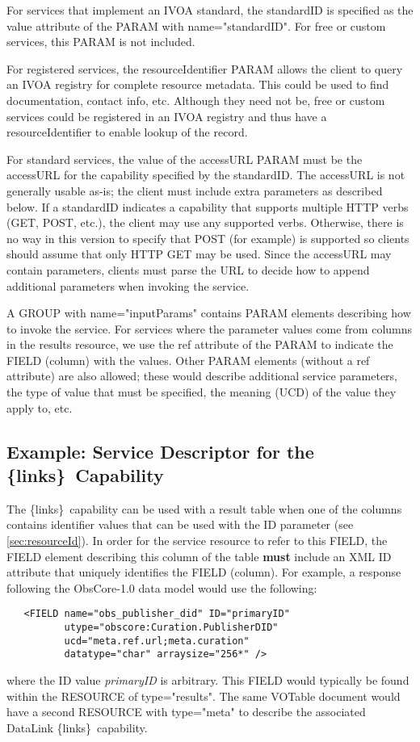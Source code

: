 \documentclass[11pt,a4paper]{ivoa}
\newcommand{\blinks}{\{links\}}
\newcommand{\attval}[2]{#1={\allowbreak}{"}#2{"}}
\begin{document}
For services that implement an IVOA standard, the standardID is specified
as the value attribute of the PARAM with \attval{name}{standardID}.
For free or custom services, this PARAM is not included.

For registered services, the resourceIdentifier PARAM allows the client
to query an IVOA registry for complete resource metadata. This could be
used to find documentation, contact info, etc. Although they need not be,
free or custom services could be registered in an IVOA registry and thus
have a resourceIdentifier to enable lookup of the record.

For standard services, the value of the accessURL PARAM must be the
accessURL for the capability specified by the standardID. The accessURL
is not generally usable as-is; the client must include extra parameters
as described below. If a standardID indicates a capability that supports
multiple HTTP verbs (GET, POST, etc.), the client may use any supported
verbs. Otherwise, there is no way in this version to specify that POST
(for example) is supported so clients should assume that only HTTP GET
may be used. Since the accessURL may contain parameters, clients must
parse the URL to decide how to append additional parameters when
invoking the service.

A GROUP with \attval{name}{inputParams} contains PARAM elements describing
how to invoke the service. For services where the parameter values
come from columns in the results resource, we use the ref attribute of
the PARAM to indicate the FIELD (column) with the values. Other PARAM
elements (without a ref attribute) are also allowed; these would describe
additional service parameters, the type of value that must be specified,
the meaning (UCD) of the value they apply to, etc.


\subsection{Example: Service Descriptor for the \blinks\ Capability}

The \blinks\ capability can be used with a result table when one of the
columns contains identifier values that can be used with the ID parameter
(see \ref{sec:resourceId}).
In order for the service resource to refer to this FIELD,
the FIELD element describing this column of the table
{\bf must} include an XML ID attribute
that uniquely identifies the FIELD (column).
For example, a response following the ObsCore-1.0 data model
would use the following:
\begin{verbatim}
   <FIELD name="obs_publisher_did" ID="primaryID"
          utype="obscore:Curation.PublisherDID"
          ucd="meta.ref.url;meta.curation"
          datatype="char" arraysize="256*" />
\end{verbatim}
where the ID value {\em primaryID\/} is arbitrary.
This FIELD would typically
be found within the RESOURCE of \attval{type}{results}. The same VOTable
document would have a second RESOURCE with \attval{type}{meta} to describe
the associated DataLink \blinks\ capability.
\end{document}
